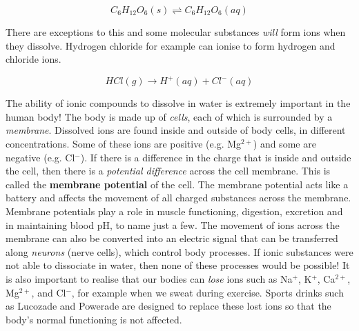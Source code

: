 \begin{equation*}
C_{6}H_{12}O_{6}(s) \rightleftharpoons C_{6}H_{12}O_{6}(aq)
\end{equation*}

There are exceptions to this and some molecular substances \textit{will} form ions when they dissolve. Hydrogen chloride for example can ionise to form hydrogen and chloride ions.

\begin{equation*}
HCl (g) \rightarrow H^{+} (aq) + Cl^{-} (aq)
\end{equation*}



\begin{IFact}{The ability of ionic compounds to dissolve in water is extremely important in the human body! The body is made up of \textit{cells}, each of which is surrounded by a \textit{membrane}. Dissolved ions are found inside and outside of body cells, in different concentrations. Some of these ions are positive (e.g. Mg$^{2+}$) and some are negative (e.g. Cl$^{-}$). If there is a difference in the charge that is inside and outside the cell, then there is a \textit{potential difference} across the cell membrane. This is called the \textbf{membrane potential} of the cell. The membrane potential acts like a battery and affects the movement of all charged substances across the membrane.  Membrane potentials play a role in muscle functioning, digestion, excretion and in maintaining blood pH, to name just a few. The movement of ions across the membrane can also be converted into an electric signal that can be transferred along \textit{neurons} (nerve cells), which control body processes. If ionic substances were not able to dissociate in water, then none of these processes would be possible! It is also important to realise that our bodies can \textit{lose} ions such as Na$^{+}$, K$^{+}$, Ca$^{2+}$, Mg$^{2+}$, and Cl$^{-}$, for example when we sweat during exercise. Sports drinks such as Lucozade and Powerade are designed to replace these lost ions so that the body's normal functioning is not affected.}
\end{IFact}

